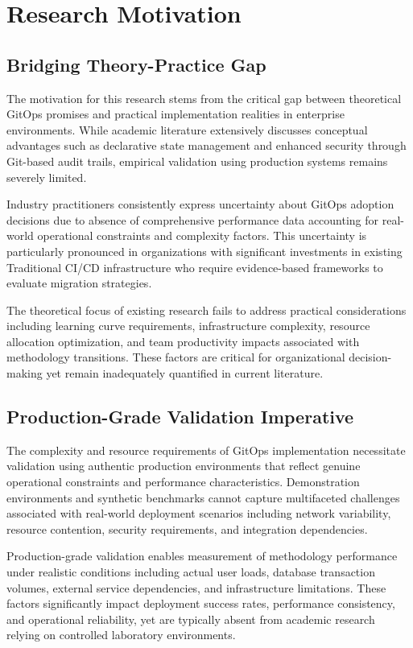 \section{Research Motivation}

\subsection{Bridging Theory-Practice Gap}
The motivation for this research stems from the critical gap between theoretical GitOps promises and practical implementation realities in enterprise environments. While academic literature extensively discusses conceptual advantages such as declarative state management and enhanced security through Git-based audit trails, empirical validation using production systems remains severely limited.

Industry practitioners consistently express uncertainty about GitOps adoption decisions due to absence of comprehensive performance data accounting for real-world operational constraints and complexity factors. This uncertainty is particularly pronounced in organizations with significant investments in existing Traditional CI/CD infrastructure who require evidence-based frameworks to evaluate migration strategies.

The theoretical focus of existing research fails to address practical considerations including learning curve requirements, infrastructure complexity, resource allocation optimization, and team productivity impacts associated with methodology transitions. These factors are critical for organizational decision-making yet remain inadequately quantified in current literature.

\subsection{Production-Grade Validation Imperative}
The complexity and resource requirements of GitOps implementation necessitate validation using authentic production environments that reflect genuine operational constraints and performance characteristics. Demonstration environments and synthetic benchmarks cannot capture multifaceted challenges associated with real-world deployment scenarios including network variability, resource contention, security requirements, and integration dependencies.

Production-grade validation enables measurement of methodology performance under realistic conditions including actual user loads, database transaction volumes, external service dependencies, and infrastructure limitations. These factors significantly impact deployment success rates, performance consistency, and operational reliability, yet are typically absent from academic research relying on controlled laboratory environments.

